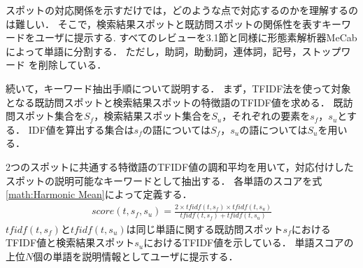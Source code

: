 \documentclass{deimj}
\begin{document}


スポットの対応関係を示すだけでは，どのような点で対応するのかを理解するのは難しい．
そこで，検索結果スポットと既訪問スポットの関係性を表すキーワードをユーザに提示する.
すべてのレビューを3.1節と同様に形態素解析器MeCabによって単語に分割する．
ただし，助詞，助動詞，連体詞，記号，ストップワード を削除している．

続いて，キーワード抽出手順について説明する．
まず，TFIDF法を使って対象となる既訪問スポットと検索結果スポットの特徴語のTFIDF値を求める．
既訪問スポット集合を$S_f$，検索結果スポット集合を$S_u$，それぞれの要素を$s_f$，$s_u$とする．
IDF値を算出する集合は$s_f$の語については$S_f$，$s_u$の語については$S_u$を用いる．

2つのスポットに共通する特徴語のTFIDF値の調和平均を用いて，対応付けしたスポットの説明可能なキーワードとして抽出する．
各単語のスコアを式\ref{math:Harmonic Mean}によって定義する．
\begin{eqnarray}
  score(t,s_f,s_u) = \frac{2 \times tfidf(t,s_f) \times tfidf(t,s_u)}{tfidf(t,s_f) + tfidf(t,s_u)}
  \label{math:Harmonic Mean}
\end{eqnarray}
$tfidf(t,s_f)$と$tfidf(t,s_u)$は同じ単語に関する既訪問スポット$s_f$におけるTFIDF値と検索結果スポット$s_u$におけるTFIDF値を示している．
単語スコアの上位$N$個の単語を説明情報としてユーザに提示する．


\end{document}
